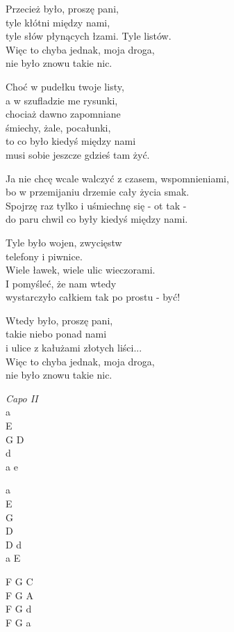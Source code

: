 \begin{text}
    \ifchorded{\hfill\break}
    Przecież było, proszę pani,\\
    tyle kłótni między nami,\\
    tyle słów płynących łzami. Tyle listów.\\
    Więc to chyba jednak, moja droga,\\
    nie było znowu takie nic.

    Choć w pudełku twoje listy,\\
    a w szufladzie me rysunki,\\
    chociaż dawno zapomniane\\
    śmiechy, żale, pocałunki,\\
    to co było kiedyś między nami\\
    musi sobie jeszcze gdzieś tam żyć.

    Ja nie chcę wcale walczyć z czasem, wspomnieniami,\\
    bo w przemijaniu drzemie cały życia smak.\\
    Spojrzę raz tylko i uśmiechnę się - ot tak -\\
    do paru chwil co były kiedyś między nami.

    Tyle było wojen, zwycięstw\\
    telefony i piwnice.\\
    Wiele ławek, wiele ulic wieczorami.\\
    I pomyśleć, że nam wtedy\\
    wystarczyło całkiem tak po prostu - być!

    Wtedy było, proszę pani,\\
    takie niebo ponad nami\\
    i ulice z kałużami złotych liści...\\
    Więc to chyba jednak, moja droga,\\
    nie było znowu takie nic.
\end{text}
\begin{chord}
    \textit{Capo II}\\
    a\\
    E\\
    G D\\
    d\\
    a e

    a\\
    E\\
    G\\
    D\\
    D d\\
    a E

    F G C\\
    F G A\\
    F G d\\
    F G a
\end{chord}